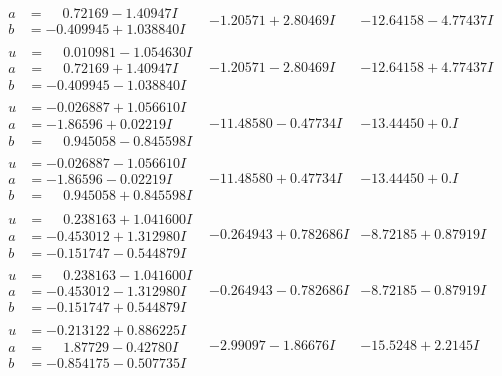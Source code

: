 \documentclass[1p]{elsarticle_modified}
\theoremstyle{definition}
\begin{document}
$$\begin{array}{c|c|c}
\begin{aligned}
a &= \phantom{-}0.72169 - 1.40947 I \\
b &= -0.409945 + 1.038840 I\end{aligned}
 & -1.20571 + 2.80469 I & -12.64158 - 4.77437 I \\ \hline\begin{aligned}
u &= \phantom{-}0.010981 - 1.054630 I \\
a &= \phantom{-}0.72169 + 1.40947 I \\
b &= -0.409945 - 1.038840 I\end{aligned}
 & -1.20571 - 2.80469 I & -12.64158 + 4.77437 I \\ \hline\begin{aligned}
u &= -0.026887 + 1.056610 I \\
a &= -1.86596 + 0.02219 I \\
b &= \phantom{-}0.945058 - 0.845598 I\end{aligned}
 & -11.48580 - 0.47734 I & -13.44450 + 0. I\phantom{ +0.000000I} \\ \hline\begin{aligned}
u &= -0.026887 - 1.056610 I \\
a &= -1.86596 - 0.02219 I \\
b &= \phantom{-}0.945058 + 0.845598 I\end{aligned}
 & -11.48580 + 0.47734 I & -13.44450 + 0. I\phantom{ +0.000000I} \\ \hline\begin{aligned}
u &= \phantom{-}0.238163 + 1.041600 I \\
a &= -0.453012 + 1.312980 I \\
b &= -0.151747 - 0.544879 I\end{aligned}
 & -0.264943 + 0.782686 I & -8.72185 + 0.87919 I \\ \hline\begin{aligned}
u &= \phantom{-}0.238163 - 1.041600 I \\
a &= -0.453012 - 1.312980 I \\
b &= -0.151747 + 0.544879 I\end{aligned}
 & -0.264943 - 0.782686 I & -8.72185 - 0.87919 I \\ \hline\begin{aligned}
u &= -0.213122 + 0.886225 I \\
a &= \phantom{-}1.87729 - 0.42780 I \\
b &= -0.854175 - 0.507735 I\end{aligned}
 & -2.99097 - 1.86676 I & -15.5248 + 2.2145 I \\ \hline\begin{aligned}

\end{aligned}
\end{array}$$
\end{document}

